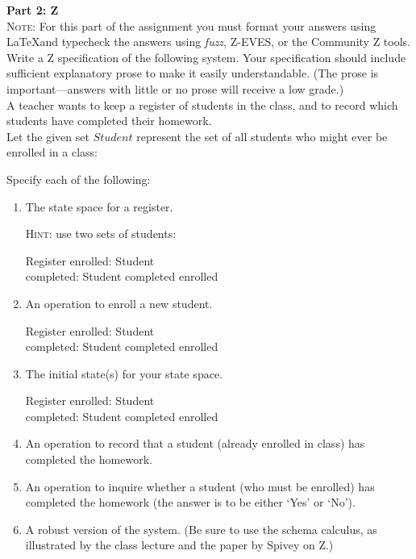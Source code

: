 \documentclass{article}
\begin{document}
\noindent \textbf{Part 2: Z} \\

\noindent \textsc{Note}: For this part of the assignment you must format your
answers using \LaTeX and typecheck the answers using {\em fuzz},  Z-EVES, or the Community Z tools.  \\

\noindent Write a Z specification of the following system. Your specification should include sufficient explanatory
prose to make it easily understandable. (The prose is important---answers with little
or no prose will receive a low grade.)\\[2ex]
A teacher wants to keep a register of students in the class, and to record which students have completed their homework. \\[2ex]
Let the given set $Student$ represent the set of all students who might ever be enrolled in a class:
\begin{zed}
[Student]
\end{zed}
Specify each of the following:
\begin{enumerate}
\item The state space for a register.

\textsc{Hint}: use two sets of students:
\begin{schema}{Register}
enrolled: \power Student\\
completed: \power Student
\where
completed \subseteq enrolled \\
\end{schema}
\item An operation to enroll a new student. \\
\begin{schema}{Register}
enrolled: \power Student\\
completed: \power Student
\where
completed \subseteq enrolled \\
\end{schema}  
\item The initial state(s)  for your state space. \\
\begin{schema}{Register}
enrolled: \power Student\\
completed: \power Student
\where
completed \subseteq enrolled \\
\end{schema}

\item An operation to record that a student (already enrolled in class) has completed the homework.
\item An operation to inquire whether a student (who must be enrolled) has completed the homework (the answer is to be either `Yes' or `No').
\item A robust version of the system. (Be sure to use the schema calculus, as illustrated by the class lecture and the paper by Spivey on Z.) \\  
\end{enumerate}
\end{document}

